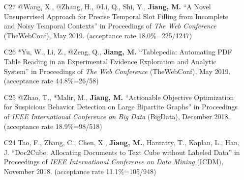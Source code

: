 \documentclass[10pt]{article}
\newenvironment{myindentpar}[1]%
{\begin{list}{}%
         {\setlength{\leftmargin}{#1}}%
         \item[]%
}
{\end{list}}
\newcounter{list}
\begin{document}
\begin{myindentpar}{0.00cm}
\begin{enumerate}[leftmargin=.5cm]
\vspace{-0.1cm}

\item[C27] @Wang, X., @Zhang, H., @Li, Q., Shi, Y., \textbf{Jiang, M.} ``A Novel Unsupervised Approach for Precise Temporal Slot Filling from Incomplete and Noisy Temporal Contexts'' in Proceedings of \emph{The Web Conference } (TheWebConf), May 2019. (acceptance rate 18.0\%=225/1247)

\vspace{-0.1cm}

\item[C26] *Yu, W., Li, Z., @Zeng, Q., \textbf{Jiang, M.} ``Tablepedia: Automating PDF Table Reading in an Experimental Evidence Exploration and Analytic System'' in Proceedings of \emph{The Web Conference } (TheWebConf), May 2019. (acceptance rate 44.8\%=26/58)

\vspace{-0.1cm}

\item[C25] @Zhao, T., *Malir, M., \textbf{Jiang, M.} ``Actionable Objective Optimization for Suspicious Behavior Detection on Large Bipartite Graphs'' in Proceedings of \emph{IEEE International Conference on Big Data} (BigData), December 2018. (acceptance rate 18.9\%=98/518)

\vspace{-0.1cm}

\item[C24] Tao, F., Zhang, C., Chen, X., \textbf{Jiang, M.}, Hanratty, T., Kaplan, L., Han, J. ``Doc2Cube: Allocating Documents to Text Cube without Labeled Data'' in Proceedings of \emph{IEEE International Conference on Data Mining } (ICDM), November 2018. (acceptance rate 11.1\%=105/948)


\end{enumerate}
\end{myindentpar}
\end{document}
